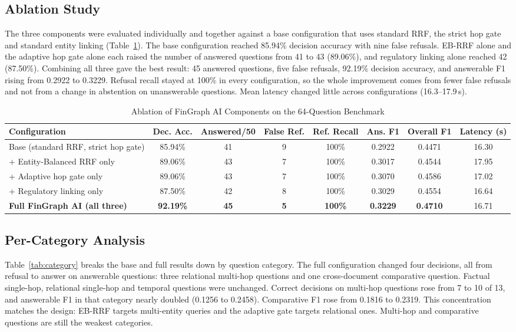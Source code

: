 \documentclass[conference]{IEEEtran}
\begin{document}
\subsection{Ablation Study}
The three components were evaluated individually and together against a base configuration that uses standard RRF, the strict hop gate and standard entity linking (Table~\ref{tab:ablation}). The base configuration reached 85.94\% decision accuracy with nine false refusals. EB-RRF alone and the adaptive hop gate alone each raised the number of answered questions from 41 to 43 (89.06\%), and regulatory linking alone reached 42 (87.50\%). Combining all three gave the best result: 45 answered questions, five false refusals, 92.19\% decision accuracy, and answerable F1 rising from 0.2922 to 0.3229. Refusal recall stayed at 100\% in every configuration, so the whole improvement comes from fewer false refusals and not from a change in abstention on unanswerable questions. Mean latency changed little across configurations (16.3--17.9\,s).

\begin{table}[t]
\caption{Ablation of FinGraph AI Components on the 64-Question Benchmark}
\label{tab:ablation}
\centering
\footnotesize
\begin{tabular}{lccccccc}
\toprule
\textbf{Configuration} & \textbf{Dec. Acc.} & \textbf{Answered/50} & \textbf{False Ref.} & \textbf{Ref. Recall} & \textbf{Ans. F1} & \textbf{Overall F1} & \textbf{Latency (s)}\\
\midrule
Base (standard RRF, strict hop gate) & 85.94\% & 41 & 9 & 100\% & 0.2922 & 0.4471 & 16.30\\
+ Entity-Balanced RRF only & 89.06\% & 43 & 7 & 100\% & 0.3017 & 0.4544 & 17.95\\
+ Adaptive hop gate only & 89.06\% & 43 & 7 & 100\% & 0.3070 & 0.4586 & 17.02\\
+ Regulatory linking only & 87.50\% & 42 & 8 & 100\% & 0.3029 & 0.4554 & 16.64\\
\textbf{Full FinGraph AI (all three)} & \textbf{92.19\%} & \textbf{45} & \textbf{5} & \textbf{100\%} & \textbf{0.3229} & \textbf{0.4710} & 16.71\\
\bottomrule
\end{tabular}
\end{table}



\subsection{Per-Category Analysis}
Table~\ref{tab:category} breaks the base and full results down by question category. The full configuration changed four decisions, all from refusal to answer on answerable questions: three relational multi-hop questions and one cross-document comparative question. Factual single-hop, relational single-hop and temporal questions were unchanged. Correct decisions on multi-hop questions rose from 7 to 10 of 13, and answerable F1 in that category nearly doubled (0.1256 to 0.2458). Comparative F1 rose from 0.1816 to 0.2319. This concentration matches the design: EB-RRF targets multi-entity queries and the adaptive gate targets relational ones. Multi-hop and comparative questions are still the weakest categories.
\end{document}
